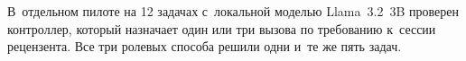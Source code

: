 В~отдельном пилоте на 12 задачах с~локальной моделью Llama~3.2~3B проверен контроллер, который назначает один или три вызова по требованию к~сессии рецензента. Все три ролевых способа решили одни и~те же пять задач.
